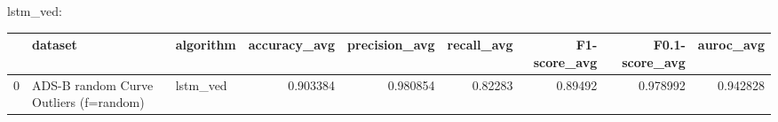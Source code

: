 lstm_ved:

\begin{tabular}{rllrrrrrr}
\hline
    & dataset                                & algorithm   &   accuracy\_avg &   precision\_avg &   recall\_avg &   F1-score\_avg &   F0.1-score\_avg &   auroc\_avg \\
\hline
  0 & ADS-B random Curve Outliers (f=random) & lstm\_ved    &       0.903384 &        0.980854 &      0.82283 &        0.89492 &         0.978992 &    0.942828 \\
\hline
\end{tabular}

